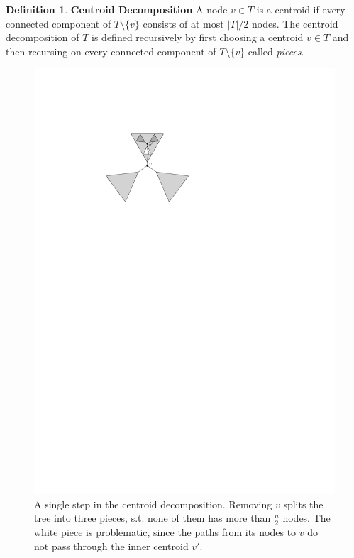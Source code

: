 \documentclass[11pt,a4paper]{article}
\theoremstyle{definition}
\newtheorem{definition}{Definition}
\theoremstyle{remark}
\begin{document}
\begin{definition} \textbf{Centroid Decomposition}
A node $v\in T$ is a centroid if every connected component of $T\setminus\{v\}$ consists of at most $|T|/2$
nodes. The centroid decomposition of $T$ is defined recursively by first choosing a centroid $v\in T$
and then recursing on every connected component of $T\setminus\{v\}$ called \emph{pieces}.
\end{definition}

\begin{figure}
\begin{center}
\includegraphics[scale=1]{centroid}
\end{center}
\caption{A single step in the centroid decomposition. Removing $v$ splits the tree into three pieces, s.t. none of them has more than $\frac{n}{2}$ nodes. The white piece is problematic, since the paths from its nodes to $v$ do not pass through the inner centroid $v'$.}
\end{figure}
\end{document}
